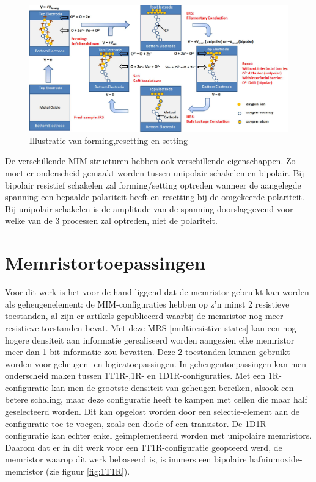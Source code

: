 \begin{figure}
  \centering
  \includegraphics[scale=0.22]{../fig/hfdstk-cel-forming-reset-set.png}
  \caption{Illustratie van forming,resetting en setting\cite{Won12}}
  \label{fig:forming-reset-set}
\end{figure}

De verschillende MIM-structuren hebben ook verschillende eigenschappen. Zo moet er onderscheid gemaakt worden tussen unipolair schakelen en bipolair. Bij bipolair resistief schakelen zal forming/setting optreden wanneer de aangelegde spanning een bepaalde polariteit heeft en resetting bij de omgekeerde polariteit. Bij unipolair schakelen is de amplitude van de spanning doorslaggevend voor welke van de 3 processen zal optreden, niet de polariteit. 


\section{Memristortoepassingen}
\label{1T1R}

Voor dit werk is het voor de hand liggend dat de memristor gebruikt kan worden als geheugenelement: de MIM-configuraties hebben op z'n minst 2 resistieve toestanden, al zijn er artikels gepubliceerd waarbij de memristor nog meer resistieve toestanden bevat\cite{Liu12}. Met deze MRS [multiresistive states] kan een nog hogere densiteit aan informatie gerealiseerd worden aangezien elke memristor meer dan 1 bit informatie zou bevatten.
Deze 2 toestanden kunnen gebruikt worden voor geheugen- en logicatoepassingen\cite{ros12}\cite{raj09}. In geheugentoepassingen kan men onderscheid maken tussen 1T1R-,1R- en 1D1R-configuraties\cite{Den13}. Met een 1R-configuratie kan men de grootste densiteit van geheugen bereiken, alsook een betere schaling, maar deze configuratie heeft te kampen met cellen die maar half geselecteerd worden. Dit kan opgelost worden door een selectie-element aan de configuratie toe te voegen, zoals een diode of een transistor. De 1D1R configuratie kan echter enkel geïmplementeerd worden met unipolaire memristors\cite{Wou09}. Daarom dat er in dit werk voor een 1T1R-configuratie geopteerd werd, de memristor waarop dit werk bebaseerd is, is immers een bipolaire hafniumoxide-memristor (zie figuur \ref{fig:1T1R}).

